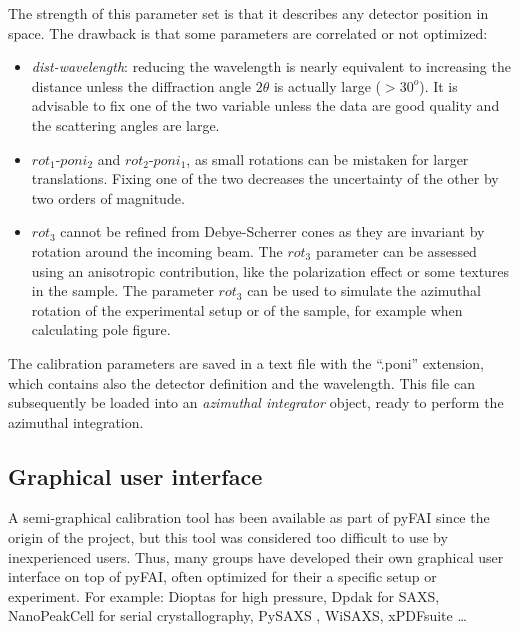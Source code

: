 \documentclass[preprint, pdf]{iucr}              %
\begin{document}
The strength of this parameter set is that it describes any detector position in
space. 
The drawback is that some parameters are correlated or not optimized:

\begin{itemize}
  \item \textit{dist-wavelength}: reducing the wavelength is nearly equivalent
  to increasing the distance unless the diffraction angle $2\theta$ is actually
  large ($>30^o$). 
  It is advisable to fix one of the two variable unless the data are good
  quality and the scattering angles are large.
  \item $rot_1$-$poni_2$ and $rot_2$-$poni_1$, as small rotations can be
  mistaken for larger translations. 
  Fixing one of the two decreases the uncertainty of the other by two orders of
  magnitude.
  \item $rot_3$ cannot be refined from Debye-Scherrer cones as they are
  invariant by rotation around the incoming beam. The $rot_3$ parameter can be
   assessed using an anisotropic contribution, like the polarization effect or
  some  textures in the sample.
  The parameter $rot_3$ can be used to simulate the azimuthal rotation of
  the experimental setup or of the sample, for example when calculating pole
  figure.
\end{itemize}
 

The calibration parameters are saved in a text file with the ``.poni''
extension, which contains also the detector definition and the wavelength.
This file can subsequently be loaded into an \textit{azimuthal integrator}
object, ready to perform the azimuthal integration.

\subsection{Graphical user interface}

A semi-graphical calibration tool has been available as part of pyFAI
\cite{fv5028} since the origin of the project, but this tool was considered too
difficult to use by inexperienced users.
Thus, many groups have developed their own graphical user interface on top of
pyFAI, often optimized for their a specific setup or experiment.
For example: Dioptas \cite{diopta_publi} for high pressure, Dpdak \cite{dpdak}
for SAXS, NanoPeakCell \cite{nanopeakcell} for serial crystallography,
PySAXS \cite{pysaxs}, WiSAXS, xPDFsuite \cite{xpdfsuite}\ldots
\end{document}

